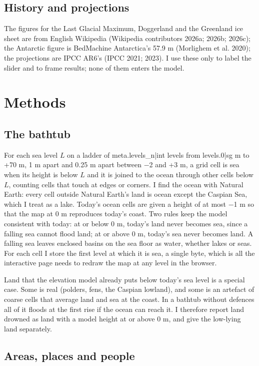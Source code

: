 \documentclass[11pt,a4paper]{article}
\begin{document}
\subsection{History and projections}

The figures for the Last Glacial Maximum, Doggerland and the Greenland ice sheet are from English Wikipedia (Wikipedia contributors 2026a; 2026b; 2026c); the Antarctic figure is BedMachine Antarctica's 57.9 m (Morlighem et al. 2020); the projections are IPCC AR6's (IPCC 2021; 2023). I use these only to label the slider and to frame results; none of them enters the model.

\section{Methods}

\subsection{The bathtub}

For each sea level $L$ on a ladder of {{meta.levels_n|int}} levels from {{levels.0|sg}} m to +70 m, 1 m apart and 0.25 m apart between $-$2 and +3 m, a grid cell is sea when its height is below $L$ and it is joined to the ocean through other cells below $L$, counting cells that touch at edges or corners. I find the ocean with Natural Earth: every cell outside Natural Earth's land is ocean except the Caspian Sea, which I treat as a lake. Today's ocean cells are given a height of at most $-$1 m so that the map at 0 m reproduces today's coast. Two rules keep the model consistent with today: at or below 0 m, today's land never becomes sea, since a falling sea cannot flood land; at or above 0 m, today's sea never becomes land. A falling sea leaves enclosed basins on the sea floor as water, whether lakes or seas. For each cell I store the first level at which it is sea, a single byte, which is all the interactive page needs to redraw the map at any level in the browser.

Land that the elevation model already puts below today's sea level is a special case. Some is real (polders, fens, the Caspian lowland), and some is an artefact of coarse cells that average land and sea at the coast. In a bathtub without defences all of it floods at the first rise if the ocean can reach it. I therefore report land drowned as land with a model height at or above 0 m, and give the low-lying land separately.

\subsection{Areas, places and people}
\end{document}
